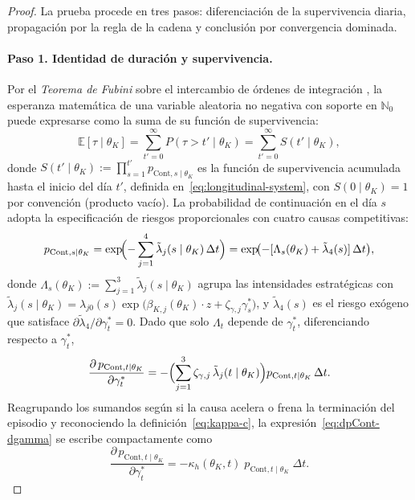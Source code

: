 \documentclass[12pt]{article}
\providecommand{\textcite}{\citet}
\theoremstyle{definition}
\theoremstyle{remark}
\newcommand{\1}{\mathbf{1}}
\begin{document}
\begin{proof}
La prueba procede en tres pasos: diferenciación de la supervivencia diaria, propagación
por la regla de la cadena y conclusión por convergencia dominada.

\paragraph{Paso 1. Identidad de duración y supervivencia.}
Por el \textit{Teorema de Fubini} sobre el intercambio de órdenes de integración
\textcite{Fubini1907}, la esperanza matemática de una variable aleatoria no negativa
con soporte en $\mathbb{N}_0$ puede expresarse como la suma de su función de
supervivencia:
\begin{equation}
\label{eq:duracion-identidad}
\mathbb{E}[\tau\mid\theta_K]
= \sum_{t'=0}^{\infty} P(\tau > t'\mid\theta_K)
= \sum_{t'=0}^{\infty} S(t'\mid\theta_K),
\end{equation}
donde $S(t'\mid\theta_K):=\prod_{s=1}^{t'}p_{\mathrm{Cont},s\mid\theta_K}$ es la función
de supervivencia acumulada hasta el inicio del día $t'$, definida
en~\eqref{eq:longitudinal-system}, con $S(0\mid\theta_K)=1$ por convención (producto
vacío). La probabilidad de continuación en el día $s$ adopta la especificación de
riesgos proporcionales con cuatro causas competitivas:
\[
p_{\mathrm{Cont},s\mid\theta_K}
= \exp\!\Bigl(-\sum_{j=1}^{4}\tilde{\lambda}_j(s\mid\theta_K)\,\Delta t\Bigr)
= \exp\!\bigl(-[\Lambda_s(\theta_K)+\tilde{\lambda}_4(s)]\,\Delta t\bigr),
\]
donde $\Lambda_s(\theta_K):=\sum_{j=1}^{3}\tilde{\lambda}_j(s\mid\theta_K)$ agrupa las
intensidades estratégicas con $\tilde{\lambda}_j(s\mid\theta_K)=\lambda_{j0}(s)\exp\bigl(\beta_{K,j}(\theta_K)\cdot z+\zeta_{\gamma,j}\gamma_s^\ast\bigr)$,
y $\tilde{\lambda}_4(s)$ es el riesgo exógeno que satisface $\partial\tilde{\lambda}_4/\partial\gamma_t^\ast=0$.
Dado que solo $\Lambda_t$ depende de $\gamma_t^\ast$, diferenciando respecto a $\gamma_t^\ast$,
\begin{equation}
\label{eq:dpCont-dgamma}
\frac{\partial\,p_{\mathrm{Cont},t\mid\theta_K}}{\partial\gamma_t^\ast}
= -\Bigl(\sum_{j=1}^{3}\zeta_{\gamma,j}\,\tilde{\lambda}_j(t\mid\theta_K)\Bigr)
  p_{\mathrm{Cont},t\mid\theta_K}\,\Delta t.
\end{equation}
Reagrupando los sumandos según si la causa acelera o frena la terminación del episodio
y reconociendo la definición~\eqref{eq:kappa-c}, la expresión~\eqref{eq:dpCont-dgamma}
se escribe compactamente como
\[
\frac{\partial\,p_{\mathrm{Cont},t\mid\theta_K}}{\partial\gamma_t^\ast}
= -\kappa_h(\theta_K,t)\;p_{\mathrm{Cont},t\mid\theta_K}\;\Delta t.
\]


\end{proof}
\end{document}
